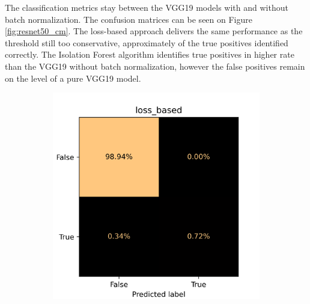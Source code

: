 The classification metrics stay between the VGG19 models with and without batch normalization.
The confusion matrices can be seen on Figure \ref{fig:resnet50_cm}.
The loss-based approach delivers the same performance as the threshold still too conservative,
approximately \small {} of the true positives identified correctly.
The Isolation Forest algorithm identifies true positives in higher rate than the VGG19 without
batch normalization, however the false positives remain on the level of a pure VGG19 model.

\begin{figure}[!ht]
    \centering
    \begin{subfigure}{0.4\textwidth}
        \centering
        \includegraphics[width=\textwidth]{./results/resnet50_vgg19/20230514_213740_loss_based_cm.png}
    \end{subfigure}
    \begin{subfigure}{0.4\textwidth}
        \centering

\end{subfigure}
\end{figure}
